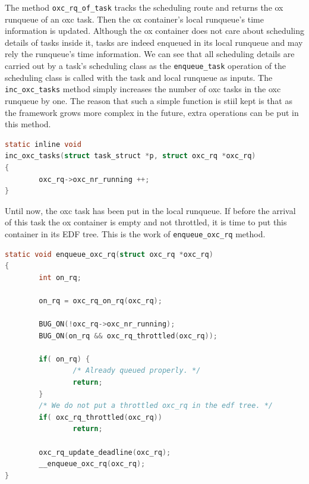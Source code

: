The method \texttt{oxc\_rq\_of\_task} tracks the scheduling route and 
returns the ox runqueue of an oxc task. Then the ox container's local 
runqueue's time information is updated. Although the ox container does 
not care about scheduling details of tasks inside it, tasks are indeed 
enqueued in its local runqueue and may rely the runqueue's time information. 
We can see that all scheduling details are carried out by a task's 
scheduling class as the \texttt{enqueue\_task} operation of the 
scheduling class is called with the task and local runqueue as inputs. 
The \texttt{inc\_oxc\_tasks} method simply increases the number of oxc 
tasks in the oxc runqueue by one. The reason that such a simple function 
is stiil kept is that as the framework grows more complex in the future, 
extra operations can be put in this method.

\begin{lstlisting}[language=C, 
		caption={To update the number of tasks inside a container} ]
static inline void 
inc_oxc_tasks(struct task_struct *p, struct oxc_rq *oxc_rq)
{
        oxc_rq->oxc_nr_running ++;
}
\end{lstlisting}

Until now, the oxc task has been put in the local runqueue. 
If before the arrival of this task the ox container is empty and not 
throttled, it is time to put this container in its EDF tree.
This is the work of \texttt{enqueue\_oxc\_rq} method. 

\begin{lstlisting}[language=C, 
		caption={To put an ox container in the EDF tree
					if necessary}]
static void enqueue_oxc_rq(struct oxc_rq *oxc_rq)
{
        int on_rq;

        on_rq = oxc_rq_on_rq(oxc_rq);

        BUG_ON(!oxc_rq->oxc_nr_running);
        BUG_ON(on_rq && oxc_rq_throttled(oxc_rq));

        if( on_rq) {
                /* Already queued properly. */
                return;
        }
        /* We do not put a throttled oxc_rq in the edf tree. */
        if( oxc_rq_throttled(oxc_rq))
                return;

        oxc_rq_update_deadline(oxc_rq);
        __enqueue_oxc_rq(oxc_rq);
}
\end{lstlisting}

